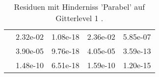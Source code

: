 \begin{table}
\begin{tabular}{c|cc|cc|}
\multicolumn{1}{|c|}{} & \multicolumn{1}{|c|}{  2.32e-02} & \multicolumn{1}{|c|}{  1.08e-18} & \multicolumn{1}{|c|}{  2.36e-02} & \multicolumn{1}{|c|}{  5.85e-07} \\ 
\multicolumn{1}{|c|}{} & \multicolumn{1}{|c|}{  3.90e-05} & \multicolumn{1}{|c|}{  9.76e-18} & \multicolumn{1}{|c|}{  4.05e-05} & \multicolumn{1}{|c|}{  3.59e-13} \\ 
\multicolumn{1}{|c|}{} & \multicolumn{1}{|c|}{  1.48e-10} & \multicolumn{1}{|c|}{  6.51e-18} & \multicolumn{1}{|c|}{  1.59e-10} & \multicolumn{1}{|c|}{  1.20e-15} \\ 
\hline 
\end{tabular}\caption{Residuen mit Hinderniss 'Parabel' auf Gitterlevel 1 .}\label{tab:Residuum_Parabel_level1}
\end{table} 
